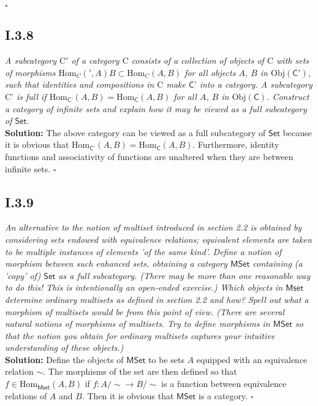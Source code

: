 \documentclass[11pt,a4paper]{article}
\newcommand{\morph}[3]{\text{Hom}_{#1}(#2,#3)}
\begin{document}
\noindent $\square$

\subsection*{I.3.8} \textit{A subcategory $\text{C}'$ of a category $\text{C}$ consists of a collection of objects of $\text{C}$ with sets of morphisms $\morph{C}'{A}{B} \subset \morph{C}{A}{B}$ for all objects $A$, $B$ in $\text{Obj}(\textsf{C}')$, such that identities and compositions in $\text{C}$ make $\textsf{C'}$ into a category.  A subcategory $\text{C'}$ is full if $\morph{\textsf{C'}}{A}{B} = \morph{\textsf{C}}{A}{B}$ for all $A$, $B$ in $\text{Obj}(\textsf{C})$. Construct a category of infinite sets and explain how it may be viewed as a full subcategory of $\textsf{Set}$.}\\

\noindent \textbf{Solution: } The above category can be viewed as a full subcategory of $\textsf{Set}$ because it is obvious that $\morph{\textsf{C'}}{A}{B} = \morph{\textsf{C}}{A}{B}$. Furthermore, identity functions and associativity of functions are unaltered when they are between infinite sets. $\square$

\subsection*{I.3.9}\textit{An alternative to the notion of multiset introduced in section 2.2 is obtained by considering sets endowed with equivalence relations; equivalent elements are taken to be multiple instances of elements 'of the same kind'.  Define a notion of morphism between such enhanced sets, obtaining a category $\textsf{MSet}$ containing (a 'copy' of) $\textsf{Set}$ as a full subcategory. (There may be more than one reasonable way to do this! This is intentionally an open-ended exercise.) Which objects in $\textsf{Mset}$ determine ordinary multisets as defined in section 2.2 and how?  Spell out what a morphism of multisets would be from this point of view. (There are several natural notions of morphisms of multisets.  Try to define morphisms in $\textsf{MSet}$ so that the notion you obtain for ordinary multisets captures your intuitive understanding of these objects.)}\\

\noindent \textbf{Solution: }  Define the objects of $\textsf{MSet}$ to be sets $A$ equipped with an equivalence relation $\sim$.  The morphisms of the set are then defined so that $f \in \morph{\textsf{Mset}}{A}{B}$ if $f: A / \sim \rightarrow B / \sim$ is a function between equivalence relations of $A$ and $B$.  Then it is obvious that $\textsf{MSet}$ is a category. $\square$ 
\end{document}
